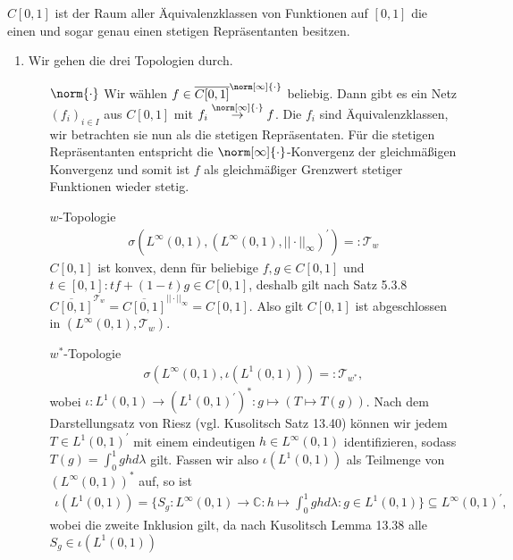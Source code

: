 \begin{solution}
$C[0,1]$ ist der Raum aller Äquivalenzklassen von Funktionen auf $[0,1]$ die
einen und sogar genau einen stetigen Repräsentanten besitzen.
  \begin{enumerate}[label = (\alph*)]
    \item Wir gehen die drei Topologien durch.
    \begin{enumerate}
      \item[\glqq $\norm{\cdot}$ \grqq] Wir wählen $f \in \overline{C[0, 1]}^{\norm[\infty]{\cdot}}$ beliebig. Dann gibt es ein Netz $(f_i)_{i \in I}$ aus $C[0,1]$ mit $f_i \stackrel{\norm[\infty]{\cdot}}{\to} f$. Die $f_i$ sind Äquivalenzklassen, wir betrachten sie nun als die stetigen Repräsentaten. Für die stetigen Repräsentanten entspricht
      die $\norm[\infty]{\cdot}$-Konvergenz der gleichmäßigen Konvergenz und
      somit ist $f$ als gleichmäßiger Grenzwert stetiger Funktionen wieder stetig.
      \item [\glqq $w$-Topologie \grqq]
      \begin{align*}
        \sigma(L^{\infty}(0,1),(L^{\infty}(0,1), ||\cdot||_{\infty})^{\prime}) =: \mathcal{T}_w
      \end{align*}
      $C[0,1]$ ist konvex, denn für beliebige $f,g \in C[0,1]$ und $t \in [0,1]:
      tf + (1-t)g \in C[0,1]$, deshalb gilt nach Satz 5.3.8
      $\overline{C[0,1]}^{\mathcal{T}_w} = \overline{C[0,1]}^{||\cdot||_{\infty}} = C[0,1]$.
      Also gilt $C[0,1]$ ist abgeschlossen in $(L^{\infty}(0,1), \mathcal{T}_w)$.
      \item [\glqq $w^*$-Topologie \grqq]
      \begin{align*}
        \sigma(L^{\infty}(0,1),\iota(L^1(0,1))) =: \mathcal{T}_{w^*},
      \end{align*}
      wobei $\iota: L^1(0,1) \rightarrow (L^1(0,1)^{\prime})^*: g \mapsto (T \mapsto T(g))$.
      Nach dem Darstellungsatz von Riesz (vgl. Kusolitsch Satz 13.40) können wir
      jedem $T \in L^1(0,1)^{\prime}$ mit einem eindeutigen $h \in L^{\infty}(0,1)$
      identifizieren, sodass $T(g) = \int_{0}^1 gh d\lambda$ gilt.
      Fassen wir also $\iota(L^1(0,1))$ als Teilmenge von $(L^{\infty}(0,1))^*$ auf,
      so ist
      \begin{align*}
      \iota(L^1(0,1)) = \{S_g: L^{\infty}(0,1) \rightarrow \mathbb{C}: h \mapsto \int_0^1gh d\lambda
      : g \in L^1(0,1)\} \subseteq L^{\infty}(0,1)^{\prime},
      \end{align*}
      wobei die zweite
      Inklusion gilt, da nach Kusolitsch Lemma 13.38 alle $S_g \in \iota(L^1(0,1))$

\end{enumerate}
\end{enumerate}
\end{solution}
